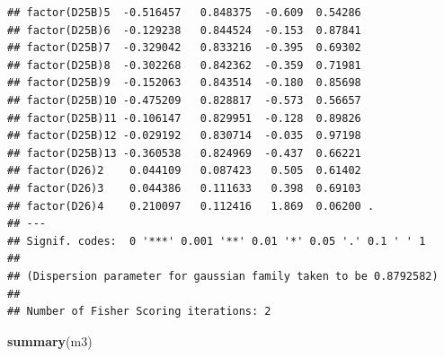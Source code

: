 \documentclass[
]{article}
\newenvironment{Shaded}{\begin{snugshade}}{\end{snugshade}}
\newcommand{\FunctionTok}[1]{\textcolor[rgb]{0.13,0.29,0.53}{\textbf{#1}}}
\newcommand{\NormalTok}[1]{#1}
\begin{document}
\begin{verbatim}
## factor(D25B)5  -0.516457   0.848375  -0.609  0.54286   
## factor(D25B)6  -0.129238   0.844524  -0.153  0.87841   
## factor(D25B)7  -0.329042   0.833216  -0.395  0.69302   
## factor(D25B)8  -0.302268   0.842362  -0.359  0.71981   
## factor(D25B)9  -0.152063   0.843514  -0.180  0.85698   
## factor(D25B)10 -0.475209   0.828817  -0.573  0.56657   
## factor(D25B)11 -0.106147   0.829951  -0.128  0.89826   
## factor(D25B)12 -0.029192   0.830714  -0.035  0.97198   
## factor(D25B)13 -0.360538   0.824969  -0.437  0.66221   
## factor(D26)2    0.044109   0.087423   0.505  0.61402   
## factor(D26)3    0.044386   0.111633   0.398  0.69103   
## factor(D26)4    0.210097   0.112416   1.869  0.06200 . 
## ---
## Signif. codes:  0 '***' 0.001 '**' 0.01 '*' 0.05 '.' 0.1 ' ' 1
## 
## (Dispersion parameter for gaussian family taken to be 0.8792582)
## 
## Number of Fisher Scoring iterations: 2
\end{verbatim}

\begin{Shaded}
\begin{Highlighting}[]
\FunctionTok{summary}\NormalTok{(m3)}
\end{Highlighting}
\end{Shaded}
\end{document}
